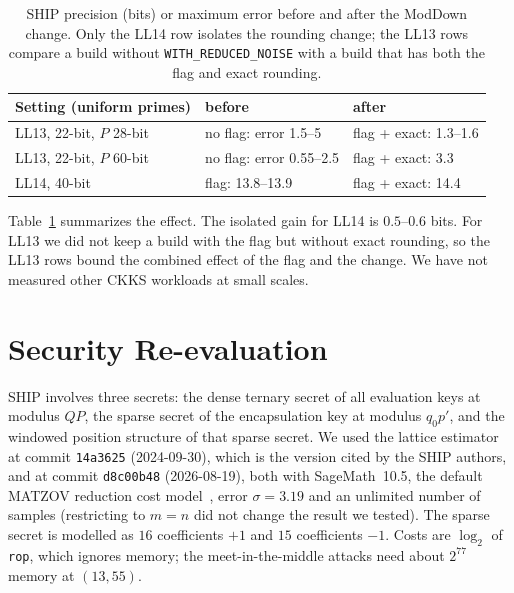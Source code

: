 \documentclass[sigconf,nonacm]{acmart}
\begin{document}
\begin{table}[t]
\caption{SHIP precision (bits) or maximum error before and after the ModDown change. Only the LL14 row isolates the rounding change; the LL13 rows compare a build without \texttt{WITH\_REDUCED\_NOISE} with a build that has both the flag and exact rounding.}
\label{tab:moddown}
\small
\begin{tabular}{p{3.1cm}p{1.9cm}p{2.1cm}}
\toprule
Setting (uniform primes) & before & after \\
\midrule
LL13, 22-bit, $P$ 28-bit & no flag: error 1.5--5 & flag + exact: 1.3--1.6 \\
LL13, 22-bit, $P$ 60-bit & no flag: error 0.55--2.5 & flag + exact: 3.3 \\
LL14, 40-bit & flag: 13.8--13.9 & flag + exact: 14.4 \\
\bottomrule
\end{tabular}
\end{table}

Table~\ref{tab:moddown} summarizes the effect.
The isolated gain for LL14 is $0.5$--$0.6$ bits.
For LL13 we did not keep a build with the flag but without exact rounding, so the LL13 rows bound the combined effect of the flag and the change.
We have not measured other CKKS workloads at small scales.

\section{Security Re-evaluation}
\label{sec:security}

SHIP involves three secrets: the dense ternary secret of all evaluation keys at modulus $QP$, the sparse secret of the encapsulation key at modulus $q_0p'$, and the windowed position structure of that sparse secret.
We used the lattice estimator~\cite{APS15,estimator} at commit \texttt{14a3625} (2024-09-30), which is the version cited by the SHIP authors, and at commit \texttt{d8c00b48} (2026-08-19), both with SageMath~10.5, the default MATZOV reduction cost model~\cite{MATZOV22}, error $\sigma=3.19$ and an unlimited number of samples (restricting to $m=n$ did not change the result we tested).
The sparse secret is modelled as $16$ coefficients $+1$ and $15$ coefficients $-1$.
Costs are $\log_2$ of \texttt{rop}, which ignores memory; the meet-in-the-middle attacks need about $2^{77}$ memory at $(13,55)$.
\end{document}
